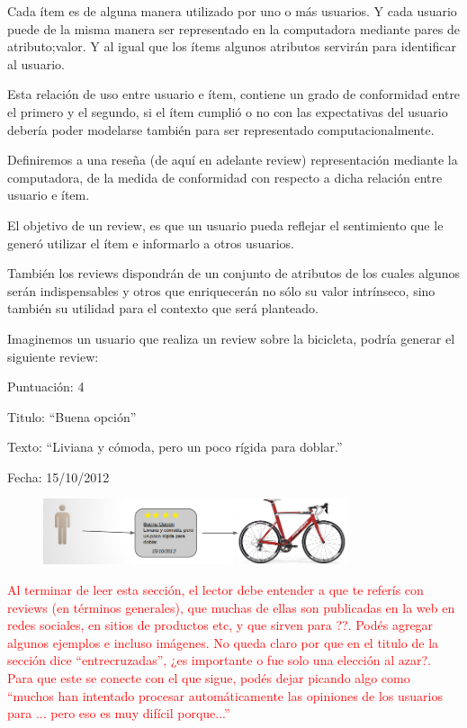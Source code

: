 Cada ítem es de alguna manera utilizado por uno o más usuarios. Y cada usuario puede de la misma manera ser representado en la computadora mediante pares de atributo;valor. Y al igual que los ítems algunos atributos servirán para identificar al usuario. 

Esta relación de uso entre usuario e ítem, contiene un grado de conformidad entre el primero y el segundo, si el ítem cumplió o no con las expectativas del usuario debería poder modelarse también para ser representado computacionalmente.

Definiremos a una reseña (de aquí en adelante review) representación mediante la computadora, de la medida de conformidad con respecto a dicha relación entre usuario e ítem. 

El objetivo de un review, es que un usuario pueda reflejar el sentimiento que le generó utilizar el ítem e informarlo a otros usuarios. 

También los reviews dispondrán de un conjunto de atributos de los cuales algunos serán indispensables y otros que enriquecerán no sólo su valor intrínseco, sino también su utilidad para el contexto que será planteado.

Imaginemos un usuario que realiza un review sobre la bicicleta, podría generar el siguiente review:

Puntuación: 4 

Titulo: ``Buena opción''

Texto: ``Liviana y cómoda, pero un poco rígida para doblar.''

Fecha: 15/10/2012

\begin{figure}
    \centering
    \includegraphics[width=0.8\textwidth,natwidth=610,natheight=642]{biciReview.png}
\end{figure}
\begin{framed}
\textcolor{red}{Al terminar de leer esta sección, el lector debe entender a que te referís con reviews (en términos generales), que muchas de ellas son publicadas en la web en redes sociales, en sitios de productos etc, y que sirven para ??. Podés agregar algunos ejemplos e incluso imágenes. No queda claro por que en el titulo de la sección dice ``entrecruzadas'', ¿es importante o fue solo una elección al azar?. Para que este se conecte con el que sigue, podés dejar picando algo como ``muchos han intentado procesar automáticamente las opiniones de los usuarios para ... pero eso es muy difícil porque...'' }
\end{framed}

